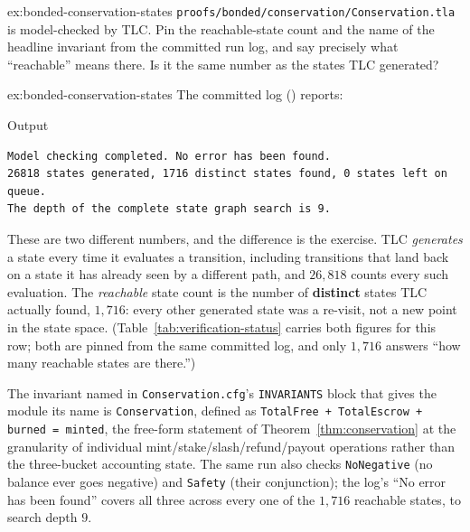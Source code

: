 \documentclass[11pt,a4paper]{article}
\theoremstyle{definition}
\theoremstyle{remark}
\begin{document}

\begin{pdexercise}[kind=Trace,rating=2]{ex:bonded-conservation-states}
\texttt{proofs/bonded/conservation/Conservation.tla} is model-checked by TLC. Pin the reachable-state count and the name of the headline invariant from the committed run log, and say precisely what ``reachable'' means there. Is it the same number as the states TLC generated?
\end{pdexercise}
\begin{pdsolution}{ex:bonded-conservation-states}
The committed log () reports:
\begin{pdlisting}{Output}{}
\begin{lstlisting}[style=pdoutput]
Model checking completed. No error has been found.
26818 states generated, 1716 distinct states found, 0 states left on queue.
The depth of the complete state graph search is 9.
\end{lstlisting}
\end{pdlisting}
These are two different numbers, and the difference is the exercise. TLC \emph{generates} a state every time it evaluates a transition, including transitions that land back on a state it has already seen by a different path, and $26{,}818$ counts every such evaluation. The \emph{reachable} state count is the number of \textbf{distinct} states TLC actually found, $1{,}716$: every other generated state was a re-visit, not a new point in the state space. (Table~\ref{tab:verification-status} carries both figures for this row; both are pinned from the same committed log, and only $1{,}716$ answers ``how many reachable states are there.'')

The invariant named in \texttt{Conservation.cfg}'s \texttt{INVARIANTS} block that gives the module its name is \texttt{Conservation}, defined as \texttt{TotalFree + TotalEscrow + burned = minted}, the free-form statement of Theorem~\ref{thm:conservation} at the granularity of individual mint/stake/slash/refund/payout operations rather than the three-bucket accounting state. The same run also checks \texttt{NoNegative} (no balance ever goes negative) and \texttt{Safety} (their conjunction); the log's ``No error has been found'' covers all three across every one of the $1{,}716$ reachable states, to search depth $9$.
\end{pdsolution}
\end{document}
